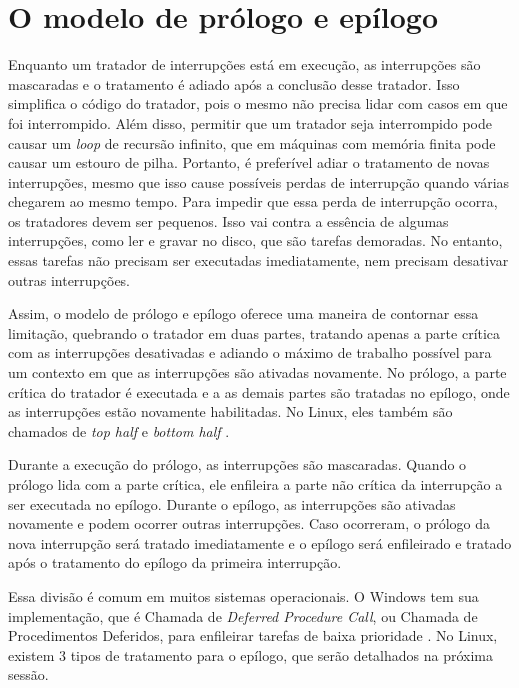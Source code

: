 \section{O modelo de prólogo e epílogo}

Enquanto um tratador de interrupções está em execução, as interrupções são mascaradas e o tratamento é adiado após a conclusão desse tratador. Isso simplifica o código do tratador, pois o mesmo não precisa lidar com casos em que foi interrompido. Além disso, permitir que um tratador seja interrompido pode causar um \textit{loop} de recursão infinito, que em máquinas com memória finita pode causar um estouro de pilha. Portanto, é preferível adiar o tratamento de novas interrupções, mesmo que isso cause possíveis perdas de interrupção quando várias chegarem ao mesmo tempo. Para impedir que essa perda de interrupção ocorra, os tratadores devem ser pequenos. Isso vai contra a essência de algumas interrupções, como ler e gravar no disco, que são tarefas demoradas. No entanto, essas tarefas não precisam ser executadas imediatamente, nem precisam desativar outras interrupções.

Assim, o modelo de prólogo e epílogo oferece uma maneira de contornar essa limitação, quebrando o tratador em duas partes, tratando apenas a parte crítica com as interrupções desativadas e adiando o máximo de trabalho possível para um contexto em que as interrupções são ativadas novamente. No prólogo, a parte crítica do tratador é executada e a as demais partes são tratadas no epílogo, onde as interrupções estão novamente habilitadas. No Linux, eles também são chamados de \textit{top half} e \textit{bottom half} \cite{OReilly}.

Durante a execução do prólogo, as interrupções são mascaradas. Quando o prólogo lida com a parte crítica, ele enfileira a parte não crítica da interrupção a ser executada no epílogo. Durante o epílogo, as interrupções são ativadas novamente e podem ocorrer outras interrupções. Caso ocorreram, o prólogo da nova interrupção será tratado imediatamente e o epílogo será enfileirado e tratado após o tratamento do epílogo da primeira interrupção.

Essa divisão é comum em muitos sistemas operacionais. O Windows tem sua implementação, que é Chamada de \textit{Deferred Procedure Call}, ou Chamada de Procedimentos Deferidos, para enfileirar tarefas de baixa prioridade \cite{InsideMicrosoftWindows}. No Linux, existem 3 tipos de tratamento para o epílogo, que serão detalhados na próxima sessão.

